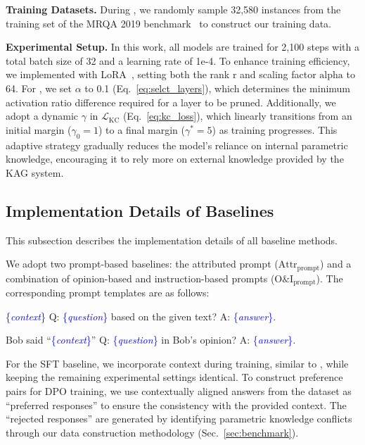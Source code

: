 \textbf{Training Datasets.} During \method{}, we randomly sample 32,580 instances from the training set of the MRQA 2019 benchmark~\cite{fisch2019mrqa} to construct our training data.



\textbf{Experimental Setup.} In this work, all models are trained for 2,100 steps with a total batch size of 32 and a learning rate of 1e-4. To enhance training efficiency, we implemented \method{} with LoRA~\cite{hu2021lora}, setting both the rank $\text{r}$ and scaling factor $\text{alpha}$ to 64. For \method{}, we set $\alpha$ to 0.1 (Eq.~\ref{eq:selct_layers}), which determines the minimum activation ratio difference required for a layer to be pruned. Additionally, we adopt a dynamic $\gamma$ in $\mathcal{L}_{\text{KC}}$ (Eq.~\ref{eq:kc_loss}), which linearly transitions from an initial margin ($\gamma_{0}=1$) to a final margin ($\gamma^*=5$) as training progresses. This adaptive strategy gradually reduces the model's reliance on internal parametric knowledge, encouraging it to rely more on external knowledge provided by the KAG system.


\subsection{Implementation Details of Baselines}
\label{append:baseline}
This subsection describes the implementation details of all baseline methods.

We adopt two prompt-based baselines: the attributed prompt ($\text{Attr}_{\text{prompt}}$) and a combination of opinion-based and instruction-based prompts ($\text{O\&I}_{\text{prompt}}$). The corresponding prompt templates are as follows:

\begin{tcolorbox}
[title=Attr based prompt ,colback=blue!10,colframe=blue!50!black,arc=1mm,boxrule=1pt,left=1mm,right=1mm,top=1mm,bottom=1mm]
\textcolor{blue}{\{\textit{context}\}} Q: \textcolor{blue}{\{\textit{question}\}} based on the given text? A: \textcolor{blue}{\{\textit{answer}\}}.
\end{tcolorbox}

\begin{tcolorbox}
[title=O\&I based prompt ,colback=blue!10,colframe=blue!50!black,arc=1mm,boxrule=1pt,left=1mm,right=1mm,top=1mm,bottom=1mm]

Bob said ``\textcolor{blue}{\{\textit{context}\}}'' Q: \textcolor{blue}{\{\textit{question}\}} in Bob's opinion? A: \textcolor{blue}{\{\textit{answer}\}}.
\end{tcolorbox}
For the SFT baseline, we incorporate context during training, similar to \method{}, while keeping the remaining experimental settings identical. To construct preference pairs for DPO training, we use contextually aligned answers from the dataset as ``preferred responses'' to ensure the consistency with the provided context. The ``rejected responses'' are generated by identifying parametric knowledge conflicts through our data construction methodology (Sec.~\ref{sec:benchmark}).

